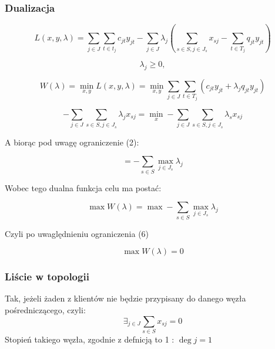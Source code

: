 \documentclass{article}
\begin{document}
\subsubsection{Dualizacja}

\begin{equation}
  L(x, y, \lambda) = \sum_{j \in J} \sum_{t \in t_j} c_{jt}y_{jt} - \sum_{j \in J} \lambda_j (\sum_{s \in S, j \in J_s } x_{sj} - \sum_{t \in T_j} q_{jt}y_{jt})
\end{equation}

\begin{equation}
  \lambda_j \geq 0,
\end{equation}


\begin{equation}
  W(\lambda) = \min_{x, y} L(x, y, \lambda) = \min_{x, y} \sum_{j \in J} \sum_{t \in T_j} (c_{jt}y_{jt} + \lambda_jq_{jt}y_{jt})
\end{equation}


\begin{equation}
  - \sum_{j \in J} \sum_{s \in S, j \in J_s} \lambda_jx_{sj} = \min_x -\sum_{j \in J}\sum_{s \in S, j \in J_s} \lambda_sx_{sj}
\end{equation}


A biorąc pod uwagę ograniczenie (2):


\begin{equation}
  = - \sum_{s \in S} \max_{j \in J_s} \lambda_j
\end{equation}

Wobec tego dualna funkcja celu ma postać:

\begin{equation}
   \max W(\lambda) = \max - \sum_{s \in S} \max_{j \in J_s} \lambda_j
\end{equation}

Czyli po uwaględnieniu ograniczenia (6)

\begin{equation}
  \max W(\lambda) = 0
\end{equation}

\subsubsection{Liście w topologii}
 Tak, jeżeli żaden z klientów nie będzie przypisany do danego węzła pośredniczącego, czyli:
 \begin{equation}
   \exists_{j \in J} \sum_{s \in S} x_{sj} = 0
 \end{equation}
 Stopień takiego węzła, zgodnie z defnicją to 1 : $\deg j = 1$
\end{document}
